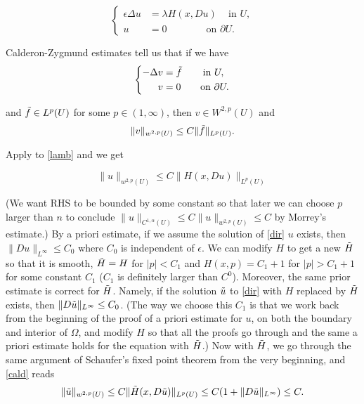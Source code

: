 \documentclass[11pt,reqno]{amsart}
\numberwithin{figure}{section}
\theoremstyle{plain}
\theoremstyle{remark}
\numberwithin{equation}{section}
\begin{document}
\begin{appendices}
\begin{equation}
\label{lamb}
\left\{
  \begin{aligned}
   \epsilon \Delta u &= \lambda H(x, Du) \quad \, \text{in } U, \\
              u &= 0 \qquad \qquad \text{on } \partial U.
  \end{aligned}
\right.
\end{equation}

Calderon-Zygmund estimates tell us that if we have
\begin{equation}
\label{cald}
\left\{
  \begin{aligned}
  - \Delta v &=\Tilde{f}   \qquad \, \text{in } U, \\
              v &= 0 \qquad \text{on } \partial U.
  \end{aligned}
\right.
\end{equation}

and $\Tilde{f} \in {L^p(U)}$ for some $p\in (1, \infty)$, then $v \in W^{2,p}(U)$ and $$\|v\|_{w^{2,p}(U)} \leq C\|\Tilde{f}\|_{L^p(U)}.$$ 

Apply to \eqref{lamb} and we get

\begin{equation}
    \|u\|_{w^{2,p}(U)} \leq C\|H(x, Du)\|_{L^p(U)}
\end{equation}


(We want RHS to be bounded by some constant so that later we can choose $p$ larger than $n$ to  conclude $ \|u\|_{C^{1, \alpha}(U)} \leq   C\|u\|_{w^{2,p}(U)} \leq C$ by Morrey's estimate.) By a priori estimate, if we assume the solution of \eqref{dir} $u$ exists, then $\| Du\|_{L^\infty} \leq C_0$ where $C_0$ is independent of $\epsilon$. We can modify $H$ to get a new $\Tilde{H}$ so that it is smooth, $\Tilde{H} = H$ for $|p|<C_1$ and $H(x,p)=C_1+1$ for $|p|>C_1+1$ for some constant $C_1$ ($C_1$ is definitely larger than $C^0$). Moreover, the same prior estimate is correct for $\Tilde{H}$. Namely, if the solution $\Tilde{u}$ to \eqref{dir} with $H$ replaced by $\Tilde{H}$ exists, then $\| D\Tilde{u}\|_{L^\infty} \leq C_0$. (The way we choose this $C_1$ is that we work back from the beginning of the proof of a priori estimate for $u$, on both the boundary and interior of $\Omega$, and modify $H$ so that all the proofs go through and the same a priori estimate holds for the equation with $\Tilde{H}$.) Now with $\Tilde{H}$, we go through the same argument of Schaufer's fixed point theorem from the very beginning, and \eqref{cald} reads
\begin{equation}
       \|\Tilde{u}\|_{w^{2,p}(U)} \leq C\|\Tilde{H}(x, D\Tilde{u})\|_{L^p(U)} \leq C(1+\|D\Tilde{u}\|_{L^\infty}) \leq C.
\end{equation}


\end{appendices}
\end{document}
